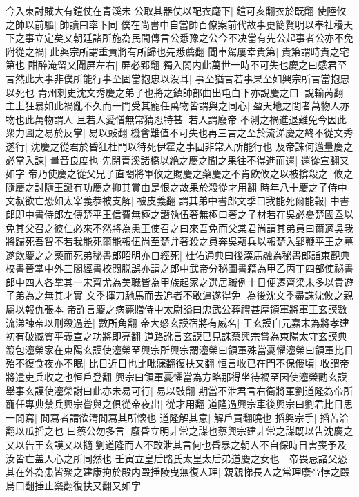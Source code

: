 今入東討賊大有鎧仗在青溪未公取其器仗以配衣麾下|{
	鎧可亥翻衣於既翻}
使陸攸之帥以前驅|{
	帥讀曰率下同}
僕在尚書中自當帥百僚案前代故事更簡賢明以奉社稷天下之事立定矣又朝廷諸所施為民間傳言公悉豫之公今不决當有先公起事者公亦不免附從之禍|{
	此興宗所謂重責將有所歸也先悉薦翻}
聞車駕屢幸貴第|{
	貴第謂時貴之宅第也}
酣醉淹留又聞屏左右|{
	屏必郢翻}
獨入閤内此萬世一時不可失也慶之曰感君至言然此大事非僕所能行事至固當抱忠以没耳|{
	事至猶言若事果至如興宗所言當抱忠以死也}
青州刺史沈文秀慶之弟子也將之鎮帥部曲出屯白下亦說慶之曰|{
	說輸芮翻}
主上狂暴如此禍亂不久而一門受其寵任萬物皆謂與之同心|{
	盈天地之間者萬物人亦物也此萬物謂人}
且若人愛憎無常猜忍特甚|{
	若人謂廢帝}
不測之禍進退難免今因此衆力圖之易於反掌|{
	易以䜴翻}
機會難值不可失也再三言之至於流涕慶之終不從文秀遂行|{
	沈慶之從君於昏狂杜門以待死伊霍之事固非常人所能行也}
及帝誅何邁量慶之必當入諫|{
	量音良度也}
先閉青溪諸橋以絶之慶之聞之果往不得進而還|{
	還從宣翻又如字}
帝乃使慶之從父兄子直閤將軍攸之賜慶之藥慶之不肯飲攸之以被揜殺之|{
	攸之隨慶之討隨王誕有功慶之抑其賞由是恨之故果於殺從才用翻}
時年八十慶之子侍中文叔欲亡恐如太宰義恭被支解|{
	被皮義翻}
謂其弟中書郎文季曰我能死爾能報|{
	中書郎即中書侍郎左傳楚平王信費無極之譛執伍奢無極曰奢之子材若在吳必憂楚國盍以免其父召之彼仁必來不然將為患王使召之曰來吾免而父棠君尚謂其弟員曰爾適吳我將歸死吾智不若我能死爾能報伍尚至楚弁奢殺之員奔吳藉兵以報楚入郢鞭平王之墓}
遂飲慶之之藥而死弟秘書郎昭明亦自經死|{
	杜佑通典曰後漢馬融為秘書郎詣東觀典校書晉掌中外三閣經書校閲脱誤亦謂之郎中武帝分秘圖書籍為甲乙丙丁四部使祕書郎中四人各掌其一宋齊尤為美職皆為甲族起家之選居職例十日便遷齊梁末多以貴遊子弟為之無其才實}
文季揮刀馳馬而去追者不敢逼遂得免|{
	為後沈文季盡誅沈攸之親屬以報仇張本}
帝詐言慶之病薨贈侍中太尉謚曰忠武公葬禮甚厚領軍將軍王玄謨數流涕諫帝以刑殺過差|{
	數所角翻}
帝大怒玄謨宿將有威名|{
	王玄謨自元嘉末為將孝建初有破臧質平義宣之功將即亮翻}
道路訛言玄謨已見誅蔡興宗嘗為東陽太守玄謨典籖包灋榮家在東陽玄謨使灋榮至興宗所興宗謂灋榮曰領軍殊當憂懼灋榮曰領軍比日殆不復食夜亦不眠|{
	比日近日也比毗寐翻復扶又翻}
恒言收已在門不保俄頃|{
	收謂帝將遣吏兵收之也恒戶登翻}
興宗曰領軍憂懼當為方略那得坐待禍至因使灋榮勸玄謨舉事玄謨使灋榮謝曰此亦未易可行|{
	易以䜴翻}
期當不泄君言右衛將軍劉道隆為帝所寵任專典禁兵興宗嘗與之俱從帝夜出|{
	從才用翻}
道隆過興宗車後興宗曰劉君比日思一閒寫|{
	閒寫者謂欲清閒寫其所懷也}
道隆解其意|{
	解戶買翻曉也}
搯興宗手|{
	搯苦洽翻以瓜搯之也}
曰蔡公勿多言|{
	廢昏立明非常之謀也蔡興宗建非常之謀既以告沈慶之又以告王玄謨又以擿劉道隆而人不敢泄其言何也昏暴之朝人不自保時日害喪予及汝皆亡盖人心之所同然也}
壬寅立皇后路氏太皇太后弟道慶之女也　帝畏忌諸父恐其在外為患皆聚之建康拘於殿内毆捶陵曳無復人理|{
	親親悌長人之常理廢帝悖之毆烏口翻捶止橤翻復扶又翻又如字}
